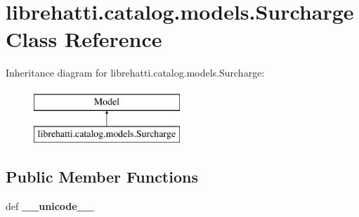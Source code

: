 \hypertarget{classlibrehatti_1_1catalog_1_1models_1_1Surcharge}{\section{librehatti.\-catalog.\-models.\-Surcharge Class Reference}
\label{classlibrehatti_1_1catalog_1_1models_1_1Surcharge}
}
Inheritance diagram for librehatti.\-catalog.\-models.\-Surcharge\-:\begin{figure}[H]
\begin{center}
\leavevmode
\includegraphics[height=2.000000cm]{classlibrehatti_1_1catalog_1_1models_1_1Surcharge}
\end{center}
\end{figure}
\subsection*{Public Member Functions}
\begin{DoxyCompactItemize}
\item 
\hypertarget{classlibrehatti_1_1catalog_1_1models_1_1Surcharge_a2fe3f353f5eb8b481865133d25acfcec}{def {\bfseries \-\_\-\-\_\-unicode\-\_\-\-\_\-}}\label{classlibrehatti_1_1catalog_1_1models_1_1Surcharge_a2fe3f353f5eb8b481865133d25acfcec}

\end{DoxyCompactItemize}
